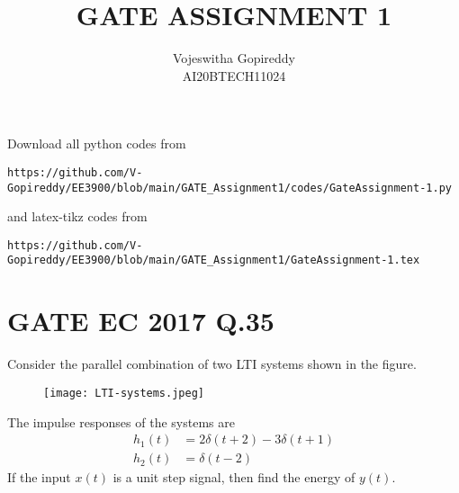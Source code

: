 \documentclass[journal,12pt,twocolumn]{IEEEtran}
\begin{document}
     \def\rightbox#1{\makebox[0in][r]{#1}}
     \def\centbox#1{\makebox[0in]{#1}}
     \def\topbox#1{\raisebox{-\baselineskip}[0in][0in]{#1}}
     \def\midbox#1{\raisebox{-0.5\baselineskip}[0in][0in]{#1}}
\vspace{3cm}
\title{GATE ASSIGNMENT 1}
\author{Vojeswitha Gopireddy \\ AI20BTECH11024}
\maketitle
\newpage
\bigskip
\renewcommand{\thefigure}{\theenumi}
\renewcommand{\thetable}{\theenumi}
Download all python codes from 
\begin{lstlisting}
https://github.com/V-Gopireddy/EE3900/blob/main/GATE_Assignment1/codes/GateAssignment-1.py
\end{lstlisting}
%
and latex-tikz codes from 
%
\begin{lstlisting}
https://github.com/V-Gopireddy/EE3900/blob/main/GATE_Assignment1/GateAssignment-1.tex
\end{lstlisting}
%
\section{GATE EC 2017 Q.35}
Consider the parallel combination of two LTI systems shown in the figure.

\begin{figure}[h]
    \centering
    \texttt{[image: LTI-systems.jpeg]}
    \label{fig:my_label}
\end{figure}

The impulse responses of the systems are
\begin{align}
    h_1(t) &= 2\delta(t+2) - 3\delta(t+1)\\
    h_2(t) &= \delta(t-2)
\end{align}
If the input $x(t)$ is a unit step signal, then find the energy of $y(t)$. 
%
\end{document}
